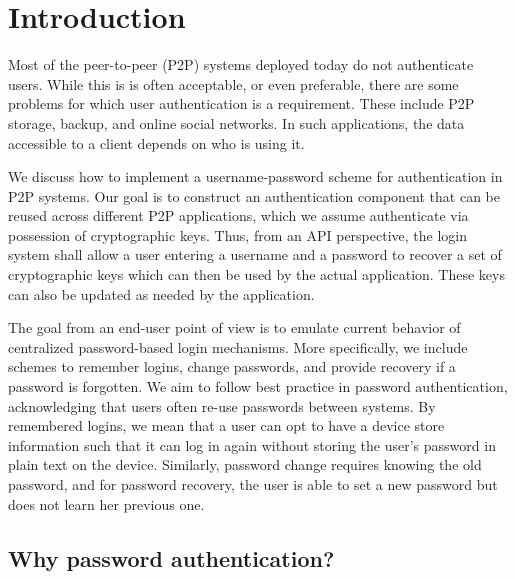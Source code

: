 \clearpage
\section{Introduction}

Most of the peer-to-peer (P2P) systems deployed today do not authenticate
users. While this is is often acceptable, or even preferable, there are some
problems for which user authentication is a requirement. These include P2P
storage, backup, and online social networks. In such applications, the data
accessible to a client depends on who is using it.

We discuss how to implement a username-password scheme for  authentication
in P2P systems. Our goal is to construct an authentication
component that can be reused across different P2P applications, which we assume 
authenticate via possession of cryptographic keys. Thus, from an API 
perspective, the login system shall allow a user entering a username and a password
to recover a set of cryptographic keys which can then be used by the actual
application. These keys can also be updated as needed
by the application.

The goal from an end-user point of view is to emulate current behavior 
of centralized password-based login mechanisms. More specifically,
we include schemes to remember logins, change passwords, and provide
recovery if a password is forgotten.  We aim to follow best practice in
password authentication, acknowledging that users often re-use passwords
between systems. By remembered logins, we mean that a user can opt to have
a device store information such that it can log in again without storing the
user's password in plain text on the device. 
Similarly, password change requires knowing the old password, and for
password recovery, the user is able to set a new password but does not learn
her previous one.


\subsection{Why password authentication?}

